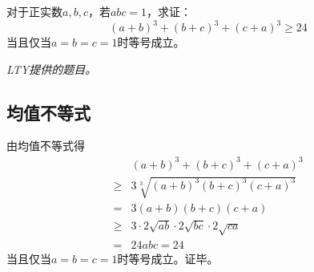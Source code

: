 

对于正实数$a, b, c$，若$abc = 1$，求证：
\[ (a + b)^3 + (b + c)^3 + (c + a)^3 \ge 24 \]
当且仅当$a = b = c = 1$时等号成立。

\emph{LTY提供的题目。}

\subsection{均值不等式}

由均值不等式得
\begin{align*}
  & (a + b)^3 + (b + c)^3 + (c + a)^3 \\
  \ge{}& 3\sqrt[3]{(a + b)^3(b + c)^3(c + a)^3} \\
  ={}& 3(a + b)(b + c)(c + a) \\
  \ge{}& 3\cdot2\sqrt{ab}\cdot2\sqrt{bc}\cdot2\sqrt{ca} \\
  ={}& 24abc = 24
\end{align*}
当且仅当$a = b = c = 1$时等号成立。证毕。
